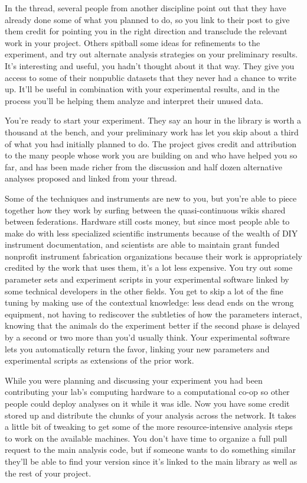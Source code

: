 In the thread, several people from another discipline point out that
they have already done some of what you planned to do, so you link to
their post to give them credit for pointing you in the right direction
and transclude the relevant work in your project. Others spitball some
ideas for refinements to the experiment, and try out alternate analysis
strategies on your preliminary results. It's interesting and useful, you
hadn't thought about it that way. They give you access to some of their
nonpublic datasets that they never had a chance to write up. It'll be
useful in combination with your experimental results, and in the process
you'll be helping them analyze and interpret their unused data.

You're ready to start your experiment. They say an hour in the library
is worth a thousand at the bench, and your preliminary work has let you
skip about a third of what you had initially planned to do. The project
gives credit and attribution to the many people whose work you are
building on and who have helped you so far, and has been made richer
from the discussion and half dozen alternative analyses proposed and
linked from your thread.

Some of the techniques and instruments are new to you, but you're able
to piece together how they work by surfing between the quasi-continuous
wikis shared between federations. Hardware still costs money, but since
most people able to make do with less specialized scientific instruments
because of the wealth of DIY instrument documentation, and scientists
are able to maintain grant funded nonprofit instrument fabrication
organizations because their work is appropriately credited by the work
that uses them, it's a lot less expensive. You try out some parameter
sets and experiment scripts in your experimental software linked by some
technical developers in the other fields. You get to skip a lot of the
fine tuning by making use of the contextual knowledge: less dead ends on
the wrong equipment, not having to rediscover the subtleties of how the
parameters interact, knowing that the animals do the experiment better
if the second phase is delayed by a second or two more than you'd
usually think. Your experimental software lets you automatically return
the favor, linking your new parameters and experimental scripts as
extensions of the prior work.

While you were planning and discussing your experiment you had been
contributing your lab's computing hardware to a computational co-op so
other people could deploy analyses on it while it was idle. Now you have
some credit stored up and distribute the chunks of your analysis across
the network. It takes a little bit of tweaking to get some of the more
resource-intensive analysis steps to work on the available machines. You
don't have time to organize a full pull request to the main analysis
code, but if someone wants to do something similar they'll be able to
find your version since it's linked to the main library as well as the
rest of your project.

